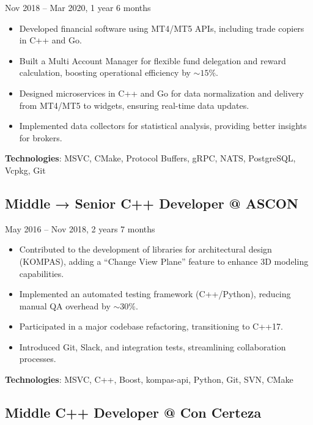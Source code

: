 \documentclass[a4paper,12pt]{article}
\begin{document}
\quad Nov 2018 – Mar 2020, 1 year 6 months

\begin{itemize}[leftmargin=15pt]
    \item Developed financial software using MT4/MT5 APIs, including trade copiers in C++ and Go.
    \item Built a Multi Account Manager for flexible fund delegation and reward calculation, boosting operational efficiency by \(\sim 15\%\).
    \item Designed microservices in C++ and Go for data normalization and delivery from MT4/MT5 to widgets, ensuring real-time data updates.
    \item Implemented data collectors for statistical analysis, providing better insights for brokers.
\end{itemize}

\textbf{Technologies}: MSVC, CMake, Protocol Buffers, gRPC, NATS, PostgreSQL, Vcpkg, Git

\vspace{3mm}

\subsection*{Middle → Senior C++ Developer @ ASCON} 

\quad May 2016 – Nov 2018, 2 years 7 months

\begin{itemize}[leftmargin=15pt]
    \item Contributed to the development of libraries for architectural design (KOMPAS), adding a “Change View Plane” feature to enhance 3D modeling capabilities.
    \item Implemented an automated testing framework (C++/Python), reducing manual QA overhead by \(\sim 30\%\).
    \item Participated in a major codebase refactoring, transitioning to C++17.
    \item Introduced Git, Slack, and integration tests, streamlining collaboration processes.
\end{itemize}

\textbf{Technologies}: MSVC, C++, Boost, kompas-api, Python, Git, SVN, CMake

\vspace{3mm}

\subsection*{Middle C++ Developer @ Con Certeza} 
\end{document}
